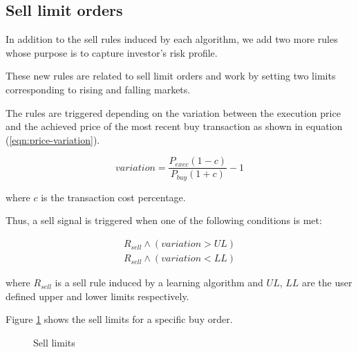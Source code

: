 \documentclass[preprint,3p,twocolumn]{elsarticle}
\begin{document}
\subsection{Sell limit orders}
\label{subsec:limit orders}
In addition to the sell rules induced by each algorithm, we add two more rules whose purpose is to capture investor's risk profile.

These new rules are related to sell limit orders and work by setting two limits corresponding to rising and falling markets.

The rules are triggered depending on the variation between the execution price and the achieved price of the most recent buy transaction as shown in equation (\ref{eqn:price-variation}).

\begin{equation} \label{eqn:price-variation}
variation = \dfrac{P_{exec}  (1 - c) }{P_{buy} (1 + c) } - 1
\end{equation}

where $c$ is the transaction cost percentage.

Thus, a sell signal is triggered when one of the following conditions is met:

\begin{align}
R_{sell} \wedge (variation > UL) \label{eqn:Sell-rule 1}\\
R_{sell} \wedge (variation < LL) \label{eqn:Sell-rule 2S}
\end{align}

where $R_{sell}$ is a sell rule induced by a learning algorithm and $UL$, $LL$ are the user defined upper and lower limits respectively.

Figure \ref{figure:Sell limits} shows the sell limits for a specific buy order.
\begin{figure}[h]
\centering
{}
\caption{\label{figure:Sell limits} Sell limits}
\end{figure}
\end{document}
